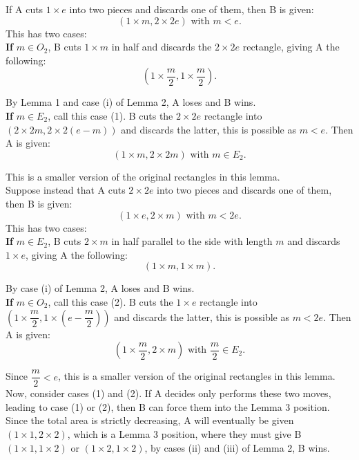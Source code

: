 \documentclass{article}
\begin{document}
If A cuts $1\times e$ into two pieces and discards one of them, then B is given:
\begin{equation*}
    (1\times m, 2\times 2e)\text{ with }  m < e.
\end{equation*}
This has two cases: \\
\textbf{If} $m \in O_2$, B cuts $1\times m$ in half and discards the $2\times 2e$ rectangle, giving A the following:
$$\left( 1\times \frac{m}2, 1\times \frac{m}2 \right).$$

By Lemma 1 and case (i) of Lemma 2, A loses and B wins. \\

\textbf{If} $m \in E_2$, call this case (1). B cuts the $2\times 2e$ rectangle into $(2\times 2m, 2\times 2(e-m))$ and discards the latter, this is possible as $m<e$. Then A is given:
$$(1\times m, 2\times 2 m) \text{ with } m \in E_2.$$

This is a smaller version of the original rectangles in this lemma. \\

Suppose instead that A cuts $2\times 2e$ into two pieces and discards one of them, then B is given:
\begin{equation*}
    (1\times e, 2\times m)\text{ with }  m < 2e.
\end{equation*}
This has two cases: \\
\textbf{If} $m \in E_2$, B cuts $2\times m$ in half parallel to the side with length $m$ and discards $1\times e$, giving A the following:
$$\left( 1\times m, 1\times m \right).$$

By case (i) of Lemma 2, A loses and B wins. \\

\textbf{If} $m \in O_2$, call this case (2). B cuts the $1\times e$ rectangle into $\left( 1\times \dfrac{m}2, 1\times \left( e - \dfrac{m}2 \right) \right )$ and discards the latter, this is possible as $m<2e$. Then A is given:
$$\left(1\times \dfrac{m}2, 2\times m\right) \text{ with } \frac{m}2 \in E_2.$$

Since $\dfrac{m}2 < e$, this is a smaller version of the original rectangles in this lemma. \\

Now, consider cases (1) and (2). If A decides only performs these two moves, leading to case (1) or (2), then B can force them into the Lemma 3 position. Since the total area is strictly decreasing, A will eventually be given $(1\times 1, 2\times 2)$, which is a Lemma 3 position, where they must give B $(1\times 1, 1\times 2)$ or $(1\times 2, 1\times 2)$, by cases (ii) and (iii) of Lemma 2, B wins. \\
\end{document}
